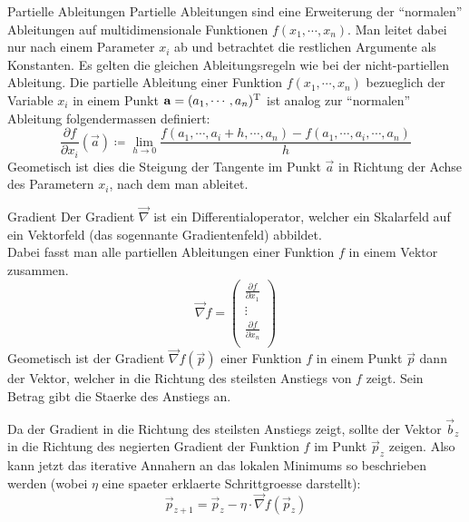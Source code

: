 \documentclass[../main]{subfiles}
\begin{document}
\begin{defbox}{Partielle Ableitungen}
  Partielle Ableitungen sind eine Erweiterung der ``normalen'' Ableitungen auf multidimensionale Funktionen $f(x_1,\cdots,x_n)$.
  Man leitet dabei nur nach einem Parameter $x_i$ ab und betrachtet die restlichen Argumente als Konstanten.
  Es gelten die gleichen Ableitungsregeln wie bei der nicht-partiellen Ableitung.
  Die partielle Ableitung einer Funktion $f(x_1,\cdots,x_n)$ bezueglich der Variable $x_i$ in einem Punkt $\mathbf{a}=(a_1,\cdots,a_n)^\mathrm{T}$ ist analog zur ``normalen'' Ableitung folgendermassen definiert:
  \begin{equation*}
    \frac{\partial f}{\partial x_i}(\vec{a}) \coloneqq \lim_{h \to 0} \frac{f(a_1,\cdots,a_i + h,\cdots,a_n)-f(a_1,\cdots,a_i,\cdots,a_n)}{h}
  \end{equation*}
  Geometisch ist dies die Steigung der Tangente im Punkt $\vec{a}$ in Richtung der Achse des Parametern $x_i$, nach dem man ableitet.
\end{defbox}

\para

\begin{defbox}{Gradient}
  Der Gradient $\vec{\nabla}$ ist ein Differentialoperator, welcher ein Skalarfeld auf ein Vektorfeld (das sogennante Gradientenfeld) abbildet.\\
  Dabei fasst man alle partiellen Ableitungen einer Funktion $f$ in einem Vektor zusammen.
  \begin{equation*}
    \vec{\nabla}f=
    \begin{pmatrix}
      \frac{\partial f}{\partial x_1} \\
      \vdots \\
      \frac{\partial f}{\partial x_n} \\
    \end{pmatrix}
  \end{equation*}
  Geometisch ist der Gradient $\vec{\nabla}f(\vec{p})$ einer Funktion $f$ in einem Punkt $\vec{p}$ dann der Vektor, welcher in die Richtung des steilsten Anstiegs von $f$ zeigt.
  Sein Betrag gibt die Staerke des Anstiegs an.
\end{defbox}

Da der Gradient in die Richtung des steilsten Anstiegs zeigt, sollte der Vektor $\vec{b}_z$ in die Richtung des negierten Gradient der Funktion $f$ im Punkt $\vec{p}_z$ zeigen.
Also kann jetzt das iterative Annahern an das lokalen Minimums so beschrieben
werden (wobei $\eta$ eine spaeter erklaerte Schrittgroesse darstellt):\\
\begin{equation}\label{eq:gradientdescent}
  \vec{p}_{z+1} = \vec{p}_z - \eta \cdot \vec{\nabla} \mathit{f}(\vec{p}_z)
\end{equation}
\end{document}
